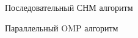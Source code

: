 \documentclass{report}
\begin{document}
\begin{figure}[H]
\caption{Последовательный СНМ алгоритм}
\end{figure}
\begin{figure}[H]
\caption{Параллельный OMP алгоритм}
\end{figure}
\end{document}
